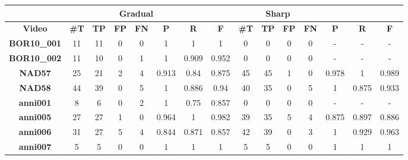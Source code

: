 \documentclass[journal]{IEEEtran}
\begin{document}
\begin{table*}[h]
\centering

\begin{tabular}{|c|c|c|c|c|c|c|c|c|c|c|c|c|c|c|}
\hline
 & \multicolumn{6}{c|}{\textbf{Gradual}} & \multicolumn{6}{c|}{\textbf{Sharp}}  \\ \hline
\textbf{Video}  & \textbf{\#T} & \textbf{TP} & \textbf{FP} & \textbf{FN} & \textbf{P} & \textbf{R} & \textbf{F} & \textbf{\#T} & \textbf{TP} & \textbf{FP} & \textbf{FN} & \textbf{P} & \textbf{R} & \textbf{F} \\ \hline
\textbf{BOR10\_001} & 11           & 11          & 0           & 0           & 1          & 1          & 1          & 0            & 0           & 0           & 0           & -          & -          & -          \\ \hline
\textbf{BOR10\_002} & 11           & 10          & 0           & 1           & 1          & 0.909      & 0.952      & 0            & 0           & 0           & 0           & -          & -          & -          \\ \hline
\textbf{NAD57}      & 25           & 21          & 2           & 4           & 0.913      & 0.84       & 0.875      & 45           & 45          & 1           & 0           & 0.978      & 1          & 0.989      \\ \hline
\textbf{NAD58}      & 44           & 39          & 0           & 5           & 1          & 0.886      & 0.94       & 40           & 35          & 0           & 5           & 1          & 0.875      & 0.933      \\ \hline
\textbf{anni001}    & 8            & 6           & 0           & 2           & 1          & 0.75       & 0.857      & 0            & 0           & 0           & 0           & -          & -          & -          \\ \hline
\textbf{anni005}    & 27           & 27          & 1           & 0           & 0.964      & 1          & 0.982      & 39           & 35          & 5           & 4           & 0.875      & 0.897      & 0.886      \\ \hline
\textbf{anni006}    & 31           & 27          & 5           & 4           & 0.844      & 0.871      & 0.857      & 42           & 39          & 0           & 3           & 1          & 0.929      & 0.963      \\ \hline
\textbf{anni007}    & 5            & 5           & 0           & 0           & 1          & 1          & 1          & 5            & 5           & 0           & 0           & 1          & 1          & 1          \\ \hline

\end{tabular}
\end{table*}
\end{document}
